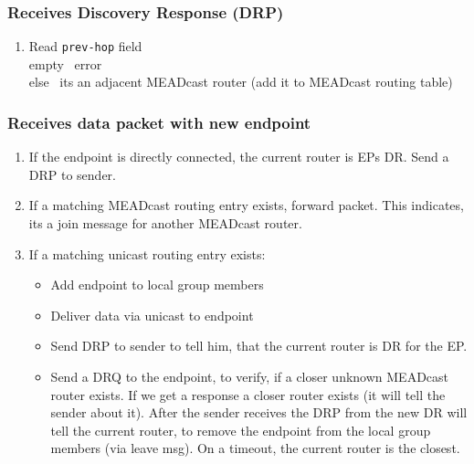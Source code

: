 \subsubsection{Receives Discovery Response (DRP)}
\begin{enumerate}\itemsep0em
    \item Read \texttt{prev-hop} field\\
        empty \textrightarrow\ error\\
        else  \textrightarrow\ its an adjacent MEADcast router (add it to
        MEADcast routing table)
\end{enumerate}


\subsubsection{Receives data packet with new endpoint}
\label{subsub:newendpoint}
\begin{enumerate}\itemsep0em
    \item If the endpoint is directly connected, the current router is EPs DR.
        Send a DRP to sender.
    \item If a matching MEADcast routing entry exists, forward packet.
        This indicates, its a join message for another MEADcast router.
    \item If a matching unicast routing entry exists:
    \begin{itemize}\itemsep0em
        \item Add endpoint to local group members
        \item Deliver data via unicast to endpoint
        \item Send DRP to sender to tell him, that the current router is DR for 
            the EP.
        \item Send a DRQ to the endpoint, to verify, if a closer unknown
            MEADcast router exists.
            If we get a response a closer router exists (it will tell the sender
            about it). After the sender receives the DRP from the new DR will
            tell the current router, to remove the endpoint from the local group
            members (via leave msg).
            On a timeout, the current router is the closest.
    \end{itemize}
\end{enumerate}

